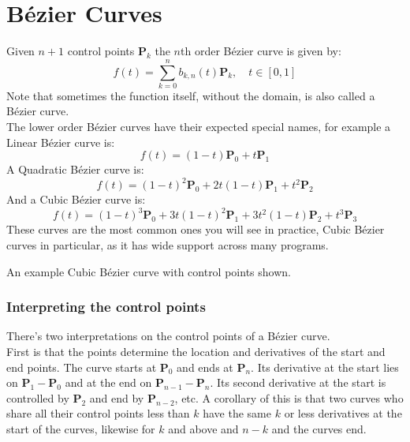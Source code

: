 
\section{Bézier Curves}
Given $n+1$ control points $\mathbf{P}_k$ the $n$th order Bézier curve is given by:
\[
	f(t) = \sum_{k=0}^nb_{k,n}(t)\mathbf{P}_k,\quad t\in [0,1]
\]
Note that sometimes the function itself,
without the domain,
is also called a Bézier curve.
\\

The lower order Bézier curves have their expected special names,
for example a Linear Bézier curve is:
\[f(t)=(1-t)\mathbf{P}_0+t\mathbf{P}_1\]
A Quadratic Bézier curve is:
\[f(t)=(1-t)^2\mathbf{P}_0+2t(1-t)\mathbf{P}_1+t^2\mathbf{P}_2\]
And a Cubic Bézier curve is:
\[f(t)=(1-t)^3\mathbf{P}_0+3t(1-t)^2\mathbf{P}_1+3t^2(1-t)\mathbf{P}_2+t^3\mathbf{P}_3\]
These curves are the most common ones you will see in practice,
Cubic Bézier curves in particular,
as it has wide support across many programs.

\begin{center}

An example Cubic Bézier curve with control points shown.
\end{center}

\subsubsection{Interpreting the control points}
There's two interpretations on the control points of a Bézier curve.
\\

First is that the points determine the location and derivatives of the start and end points.
The curve starts at $\mathbf{P}_0$ and ends at $\mathbf{P}_n$.
Its derivative at the start lies on $\mathbf{P}_1-\mathbf{P}_0$ and at the end on $\mathbf{P}_{n-1}-\mathbf{P}_n$.
Its second derivative at the start is controlled by $\mathbf{P}_2$ and end by $\mathbf{P}_{n-2}$, etc.
A corollary of this is that two curves who share all their control points less than $k$ have the same $k$ or less derivatives at the start of the curves,
likewise for $k$ and above and $n-k$ and the curves end.
\\

